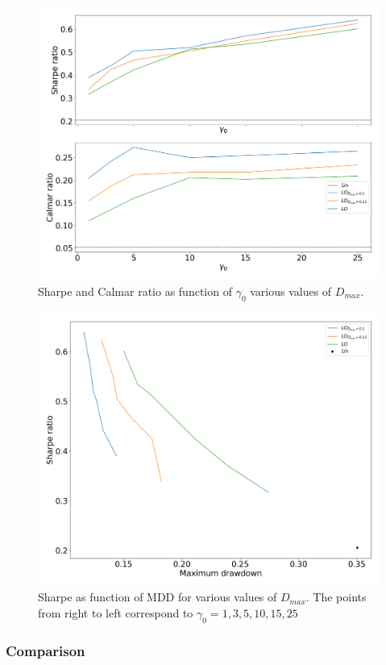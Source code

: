 \begin{figure}[H]
    \centering
    \includegraphics[width=1\textwidth]{analysis/portfolio_exercise/images/mle/sharpe_frontier_lo.png}
    \caption[Sharpe and Calmar ratio as function of $\gamma_0$ various values of $D_{max}$]{Sharpe and Calmar ratio as function of $\gamma_0$ various values of $D_{max}$.}
    \label{fig:MPC_sharpe_frontier_lo}
\end{figure}

\begin{figure}[H]
    \centering
    \includegraphics[width=1\textwidth]{analysis/portfolio_exercise/images/mle/sharpe_mdd_lo.png}
    \caption[Sharpe as function of MDD for various values of $D_{max}$]{Sharpe as function of MDD for various values of $D_{max}$. The points from right to left correspond to $\gamma_0=1,3,5,10,15,25$}
    \label{fig:MPC_sharpe_mdd_lo}
\end{figure}

\subsubsection{Comparison}
